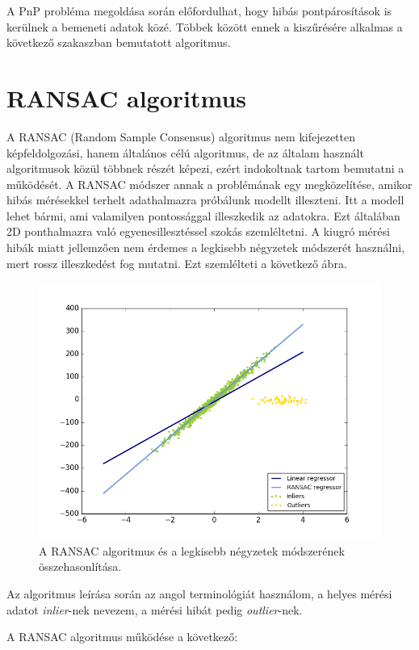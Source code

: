A PnP probléma megoldása során előfordulhat, hogy hibás pontpárosítások is kerülnek a bemeneti adatok közé. Többek között ennek a kiszűrésére alkalmas a következő szakaszban bemutatott algoritmus.

\section{RANSAC algoritmus}
A RANSAC (Random Sample Consensus) \cite{FischerRANSAC} algoritmus nem kifejezetten képfeldolgozási, hanem általános célú algoritmus, de az általam használt algoritmusok közül többnek részét képezi, ezért indokoltnak tartom bemutatni a működését. A RANSAC módszer annak a problémának egy megközelítése, amikor hibás mérésekkel terhelt adathalmazra próbálunk modellt illeszteni. Itt a modell lehet bármi, ami valamilyen pontossággal illeszkedik az adatokra. Ezt általában 2D ponthalmazra való egyenesillesztéssel szokás szemléltetni. A kiugró mérési hibák miatt jellemzően nem érdemes a legkisebb négyzetek módszerét használni, mert rossz illeszkedést fog mutatni. Ezt szemlélteti a következő ábra.

\begin{figure}[H]
\centering
\includegraphics[width=0.7\linewidth]{chapters/camera/ransac.png}
\caption{A RANSAC algoritmus és a legkisebb négyzetek módszerének összehasonlítása.}
\label{fig:ransac}
\end{figure}

Az algoritmus leírása során az angol terminológiát használom, a helyes mérési adatot \textit{inlier}-nek nevezem, a mérési hibát pedig \textit{outlier}-nek. 

A RANSAC algoritmus működése a következő:

